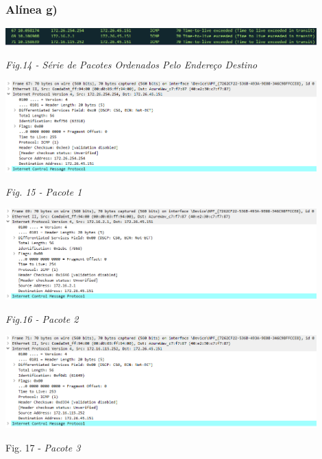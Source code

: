 \documentclass{article}
\begin{document}
\subsubsection{Alínea g)}\par\vspace{0.5cm}
\begin{center}
\includegraphics[width=12cm]{7.png}\par\caption{\textit{Fig.14 - Série de Pacotes Ordenados Pelo Endereço Destino}}\par\vspace{0.5cm}
\end{center}
\begin{center}
\includegraphics[width=12cm]{8.png}\par\caption{\textit{Fig. 15 - Pacote 1}}\par\vspace{0.5cm}
\end{center}
\begin{center}
\includegraphics[width=12cm]{9.png}\par\caption{\textit{Fig.16 - Pacote 2}}\par\vspace{0.5cm}
\end{center}
\begin{center}
\includegraphics[width=12cm]{10.png}\par\caption{Fig. 17 - \textit{Pacote 3}}\par\vspace{2cm}
\end{center}
\end{document}
